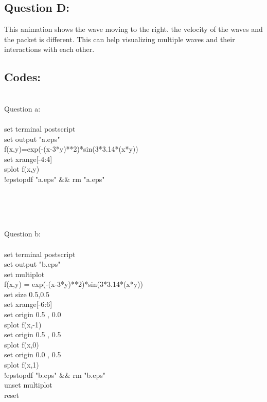 \documentclass[twocolumn]{article}
\begin{document}

\subsection{Question D:}
This animation shows the wave moving to the right. the velocity of the waves and the packet is different. This can help visualizing multiple waves and their interactions with each other.


\subsection{Codes:}

\begin{listing}
\begin{indent}
\\
Question a:
\\
\\
set terminal postscript
\\
set output "a.eps"
\\
f(x,y)=exp(-(x-3*y)**2)*sin(3*3.14*(x*y))
\\
set xrange[-4:4]
\\
splot f(x,y)
\\
!epstopdf "a.eps" && rm "a.eps"
\end{indent}
\end{listing}
\\
\\

\begin{listing}
\begin{indent}
\\
Question b:
\\
\\
set terminal postscript
\\
set output "b.eps"
\\
set multiplot
\\
f(x,y) = exp(-(x-3*y)**2)*sin(3*3.14*(x*y))
\\
set size 0.5,0.5
\\
set xrange[-6:6]
\\
set origin 0.5 , 0.0
\\
splot f(x,-1)
\\
set origin 0.5 , 0.5
\\
splot f(x,0)
\\
set origin 0.0 , 0.5
\\
splot f(x,1)
\\
!epstopdf "b.eps" && rm "b.eps"
\\
unset multiplot
\\
reset
\end{indent}
\end{listing}
\end{document}

